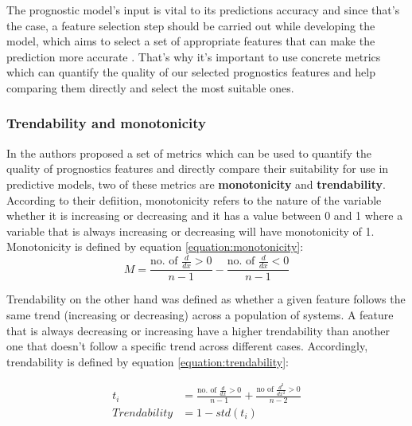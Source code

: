 The prognostic model's input is vital to its predictions accuracy \cite{coble2009} and since that's the case, a feature selection step should be carried out while developing the model, which aims to select a set of appropriate features that can make the prediction more accurate \cite{javed2012}. That's why it's important to use concrete metrics which can quantify the quality of our selected prognostics features and help comparing them directly and select the most suitable ones.

\subsubsection{Trendability and monotonicity}%
\label{subsub:trendability_and_monotonicity}
In \cite{coble2009} the authors proposed a set of metrics which can be used to quantify the quality of prognostics features and directly compare their suitability for use in predictive models, two of these metrics are \textbf{monotonicity} and \textbf{trendability}. According to their defiition, monotonicity refers to the nature of the variable whether it is increasing or decreasing and it has a value between 0 and 1 where a variable that is always increasing or decreasing will have monotonicity of 1. Monotonicity is defined by equation \ref{equation:monotonicity}: 
\begin{equation}
	M=\frac{\text{no. of }\frac{d}{dx} > 0}{n-1} - \frac{\text{no. of }\frac{d}{dx} < 0}{n-1}
\label{equation:monotonicity}
\end{equation}

Trendability on the other hand was defined as whether a given feature follows the same trend (increasing or decreasing) across a population of systems. A feature that is always decreasing or increasing have a higher trendability than another one that doesn't follow a specific trend across different cases. Accordingly, trendability is defined by equation \ref{equation:trendability}:  

\begin{equation}
	\begin{aligned}
		t_i&= \frac{\text{no. of }\frac{d}{dx}>0}{n-1}+\frac{\text{no of } \frac{d^2}{dx^2}>0}{n-2}\\
Trendability&=1-std(t_i)
	\end{aligned}
	\label{equation:trendability}
\end{equation}

